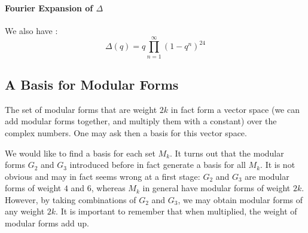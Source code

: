 \paragraph{Fourier Expansion of $\Delta$}
We also have \cite[p.95]{CourseInArithmetic}:
$$
\Delta(q) = q \prod_{n=1}^{\infty} (1-q^n)^{24}
$$



\subsection{A Basis for Modular Forms}
\label{BasisModularForms}
The set of modular forms that are weight $2k$ in fact form a vector space (we can add modular forms together, and multiply them with a constant) over the complex numbers. 
One may ask then a basis for this vector space.

We would like to find a basis for each set $M_k$. It turns out that the modular forms $G_2$ and $G_3$ introduced before in fact generate a basis for all $M_k$. 
It is not obvious and may in fact seems wrong at a first stage: $G_2$ and $G_3$ are modular forms of weight $4$ and $6$, whereas $M_k$ in general have modular forms of weight $2k$.
However, by taking combinations of $G_2$ and $G_3$, we may obtain modular forms of any weight $2k$. It is important to remember that when multiplied, the weight of modular forms add up.

